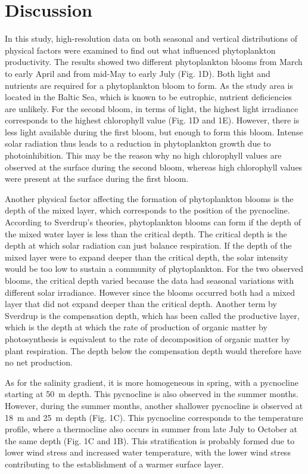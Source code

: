 \documentclass[../Main.tex]{subfiles}
\begin{document}
\section*{\crule[blue]{.3cm}{.3cm} Discussion}
In this study, high-resolution data on both seasonal and vertical distributions of physical factors were examined to find out what influenced phytoplankton productivity. The results showed two different phytoplankton blooms from March to early April and from mid-May to early July (Fig. 1D). 
Both light and nutrients are required for a phytoplankton bloom to form\supercite{munkes2021cyanobacteria}. 
As the study area is located in the Baltic Sea, which is known to be eutrophic, nutrient deficiencies are unlikely\supercite{munkes2021cyanobacteria}. 
For the second bloom, in terms of light, the highest light irradiance corresponds to the highest chlorophyll value (Fig. 1D and 1E). However, there is less light available during the first bloom, but enough to form this bloom. Intense solar radiation thus leads to a reduction in phytoplankton growth due to photoinhibition\supercite{edwards2016phytoplankton}. 
This may be the reason why no high chlorophyll values are observed at the surface during the second bloom, whereas high chlorophyll values were present at the surface during the first bloom.  

Another physical factor affecting the formation of phytoplankton blooms is the depth of the mixed layer, which corresponds to the position of the pycnocline. 
According to Sverdrup's theories, phytoplankton blooms can form if the depth of the mixed water layer is less than the critical depth\supercite{Sverdrup1953OnCF}. 
The critical depth is the depth at which solar radiation can just balance respiration. If the depth of the mixed layer were to expand deeper than the critical depth, the solar intensity would be too low to sustain a community of phytoplankton. 
For the two observed blooms, the critical depth varied because the data had seasonal variations with different solar irradiance. 
However since the blooms occurred both had a mixed layer that did not expand deeper than the critical depth. Another term by Sverdrup is the compensation depth, which has been called the productive layer, which is the depth at which the rate of production of organic matter by photosynthesis is equivalent to the rate of decomposition of organic matter by plant respiration\supercite{Sverdrup1953OnCF}. 
The depth below the compensation depth would therefore have no net production. 

As for the salinity gradient, it is more homogeneous in spring, with a pycnocline starting at \SI{50}{m} depth. This pycnocline is also observed in the summer months. However, during the summer months, another shallower pycnocline is observed at \SI{18}{m} and \SI{25}{m} depth (Fig. 1C). This pycnocline corresponds to the temperature profile, where a thermocline also occurs in summer from late July to October at the same depth (Fig. 1C and 1B). This stratification is probably formed due to lower wind stress and increased water temperature, with the lower wind stress contributing to the establishment of a warmer surface layer\supercite{carey2012eco}.
\end{document}
